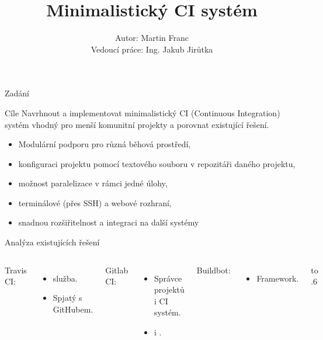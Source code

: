 \documentclass{beamer}
\title{Minimalistický CI systém}
\date{}
\author{Autor: Martin Franc \\ Vedoucí práce: Ing. Jakub Jirůtka \\}
\begin{document}



\maketitle


\begin{frame}{Zadání}
\begin{block}{Cíle}
Navrhnout a implementovat minimalistický CI (Continuous Integration) systém vhodný pro
menší komunitní projekty a porovnat existující řešení.
\end{block}
\begin{itemize}
	\item Modulární podporu pro různá běhová prostředí,
	\item konfiguraci projektu pomocí textového souboru v repozitáři daného projektu,
	\item možnost paralelizace v rámci jedné úlohy,
	\item terminálové (přes SSH) a webové rozhraní,
	\item snadnou rozšiřitelnost a integraci na další systémy
\end{itemize}
\end{frame}

\begin{frame}{Analýza existujících řešení}
\begin{columns}[T,onlytextwidth]
	Travis CI:
	\begin{itemize}
		\item {} služba.
		\item Spjatý s GitHubem.
	\end{itemize}
	Gitlab CI:
	\begin{itemize}
		\item Správce projektů i CI systém.
		\item {} i .
	\end{itemize}
	Buildbot:
	\begin{itemize}
		\item Framework.
	\end{itemize}
 	\vbox to .6
\end{columns}
\end{frame}
\end{document}
